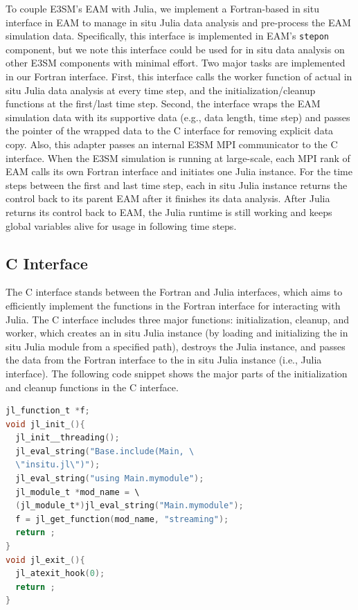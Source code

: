 \documentclass{juliacon}
\begin{document}
To couple E3SM's EAM with Julia, we implement a Fortran-based in situ interface in EAM to manage in situ Julia data analysis and pre-process the EAM simulation data. Specifically, this interface is implemented in EAM's \texttt{stepon} component, but we note this interface could be used for in situ data analysis on other E3SM components with minimal effort. Two major tasks are implemented in our Fortran interface. First, this interface calls the worker function of actual in situ Julia data analysis at every time step, and the initialization/cleanup functions at the first/last time step. Second, the interface wraps the EAM simulation data with its supportive data (e.g., data length, time step) and passes the pointer of the wrapped data to the C interface for removing explicit data copy. Also, this adapter passes an internal E3SM MPI communicator to the C interface. When the E3SM simulation is running at large-scale, each MPI rank of EAM calls its own Fortran interface and initiates one Julia instance. For the time steps between the first and last time step, each in situ Julia instance returns the control back to its parent EAM after it finishes its data analysis. After Julia returns its control back to EAM, the Julia runtime is still working and keeps global variables alive for usage in following time steps.



\subsection{C Interface}


The C interface stands between the Fortran and Julia interfaces, which aims to efficiently implement the functions in the Fortran interface for interacting with Julia. The C interface includes three major functions: initialization, cleanup, and worker, which creates an in situ Julia instance (by loading and initializing the in situ Julia module from a specified path), destroys the Julia instance, and passes the data from the Fortran interface to the in situ Julia instance (i.e., Julia interface). The following code snippet shows the major parts of the initialization and cleanup functions in the C interface.

\begin{minipage}{\linewidth}
\begin{lstlisting}[language = C, caption={C interface initialization and cleanup.}]
jl_function_t *f;
void jl_init_(){
  jl_init__threading();
  jl_eval_string("Base.include(Main, \
  \"insitu.jl\")");
  jl_eval_string("using Main.mymodule");
  jl_module_t *mod_name = \
  (jl_module_t*)jl_eval_string("Main.mymodule");
  f = jl_get_function(mod_name, "streaming");
  return ;
}
void jl_exit_(){
  jl_atexit_hook(0);
  return ;
}
\end{lstlisting}
\end{minipage}
\end{document}
